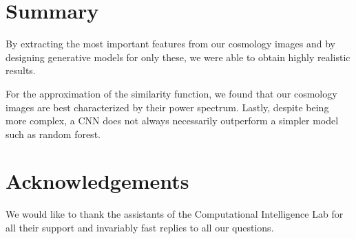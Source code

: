 \documentclass[10pt,conference,compsocconf]{IEEEtran}
\newcommand\TODO[1]{\textcolor{red}{#1}} %
\begin{document}




\section{Summary}

By extracting the most important features from our cosmology images and by designing generative models for only these, we were able to obtain highly realistic results.


For the approximation of the similarity function, we found that our cosmology images are best characterized by their power spectrum. Lastly, despite being more complex, a CNN does not always necessarily outperform a simpler model such as random forest. %


\section*{Acknowledgements}
We would like to thank the assistants of the Computational Intelligence Lab for all their support and invariably fast replies to all our questions.

\newpage





\clearpage




\end{document}
